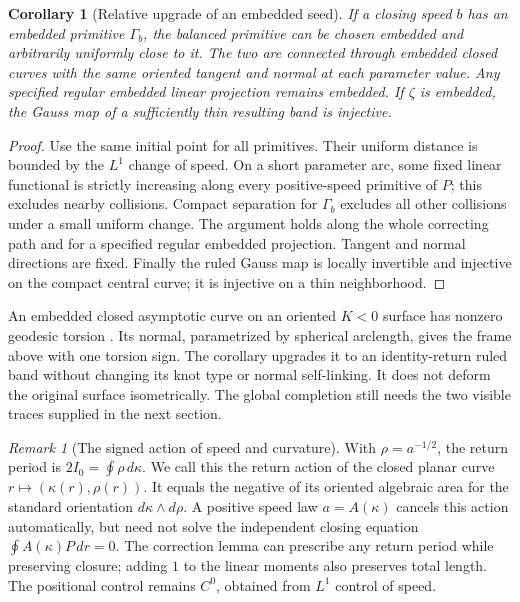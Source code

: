 \documentclass[11pt]{amsart}
\newtheorem{corollary}[theorem]{Corollary}
\theoremstyle{definition}
\theoremstyle{remark}
\newtheorem{remark}[theorem]{Remark}
\numberwithin{equation}{section}
\begin{document}
\begin{corollary}[Relative upgrade of an embedded seed]\label{cor:relative-holonomy-upgrade}
If a closing speed $b$ has an embedded primitive $\Gamma_b$, the balanced
primitive can be chosen embedded and arbitrarily uniformly close to it.
The two are connected through embedded closed curves with the same oriented
tangent and normal at each parameter value. Any specified regular embedded
linear projection remains embedded. If $\zeta$ is embedded, the Gauss map
of a sufficiently thin resulting band is injective.
\end{corollary}
\begin{proof}
Use the same initial point for all primitives. Their uniform distance is
bounded by the $L^1$ change of speed. On a short parameter arc, some fixed
linear functional is strictly increasing along every positive-speed
primitive of $P$; this excludes nearby collisions. Compact separation for
$\Gamma_b$ excludes all other collisions under a small uniform change.
The argument holds along the whole correcting path and for a specified
regular embedded projection. Tangent and normal directions are fixed.
Finally the ruled Gauss map is locally invertible and injective on the
compact central curve; it is injective on a thin neighborhood.
\end{proof}
An embedded closed asymptotic curve on an oriented $K<0$ surface has
nonzero geodesic torsion \cite[\S2.2]{GR}. Its normal, parametrized by
spherical arclength, gives the frame above with one torsion sign. The
corollary upgrades it to an identity-return ruled band without changing
its knot type or normal self-linking. It does not deform the original
surface isometrically. The global completion still needs the two visible
traces supplied in the next section.

\begin{remark}[The signed action of speed and curvature]\label{rem:holonomy-action}
With $\rho=a^{-1/2}$, the return period is $2I_0=\oint\rho\,d\kappa$.
We call this the return action of the closed planar curve
$r\mapsto(\kappa(r),\rho(r))$. It equals the negative of its oriented
algebraic area for the standard orientation $d\kappa\wedge d\rho$.
A positive speed law $a=A(\kappa)$ cancels
this action automatically, but need not solve the independent closing
equation $\oint A(\kappa)P\,dr=0$. The correction lemma can prescribe
any return period while preserving closure; adding $1$ to the linear
moments also preserves total length. The positional control remains
$C^0$, obtained from $L^1$ control of speed.
\end{remark}
\end{document}
